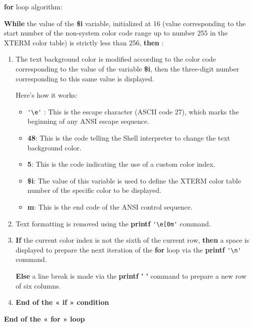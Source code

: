 \documentclass[a4paper,10pt]{article}
\begin{document}
    \begin{justify}
    	\textbf{\color{loop}for} loop algorithm:

    	\textbf{\color{loop}While} the value of the \textbf{\color{vars}\$i} variable, initialized at 16 (value corresponding to the start number of the non-system color code range up to number 255 in the XTERM color table) is strictly less than 256, \textbf{\color{loop}then} :

        \begin{enumerate}
    	    \item The text background color is modified according to the color code corresponding to the value of the variable \textbf{\color{vars}\$i}, then the three-digit number corresponding to this same value is displayed.

    	    \setlength{\parskip}{1em}

    	    Here's how it works:

    	    \begin{itemize}
                \setlength{\parskip}{1em}

    	        \item \verb+'\e'+ : This is the escape character (ASCII code 27), which marks the beginning of any ANSI escape sequence.
    	        \item \textbf{48}: This is the code telling the Shell interpreter to change the text background color.

    	        \item \textbf{5}: This is the code indicating the use of a custom color index.

    	        \item \textbf{\color{vars}\${i}}: The value of this variable is used to define the XTERM color table number of the specific color to be displayed.

    	        \item \textbf{m}: This is the end code of the ANSI control sequence.
            \end{itemize}

    	    \setlength{\parskip}{1em}

    	    \item Text formatting is removed using the \textbf{\color{cmds}printf} \verb|'\e[0m'| command.

    	    \item
    	    {
                \textbf{\color{cond}If} the current color index is not the sixth of the current row, \textbf{\color{cond}then} a space is displayed to prepare the next iteration of the \textbf{\color{loop}for} loop via the \textbf{\color{cmds}printf} \verb|'\n'| command.

                \textbf{\color{cond}Else} a line break is made via the \textbf{\color{cmds}printf ' '} command to prepare a new row of six columns.
            }

    	    \item \textbf{\color{cond}End of the « if » condition}
    	\end{enumerate}

    	\textbf{\color{loop}End of the « for » loop}
    \end{justify}
\end{document}
